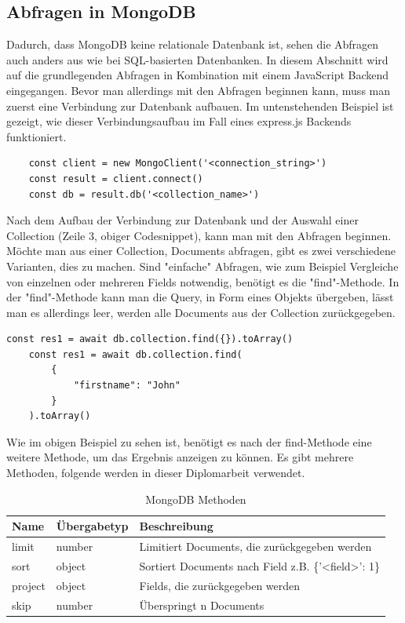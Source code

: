 \subsection{Abfragen in MongoDB}
Dadurch, dass MongoDB keine relationale Datenbank ist, sehen die Abfragen auch anders aus wie bei SQL-basierten Datenbanken. In diesem Abschnitt wird auf die grundlegenden Abfragen in Kombination mit einem JavaScript Backend eingegangen. Bevor man allerdings mit den Abfragen beginnen kann, muss man zuerst eine Verbindung zur Datenbank aufbauen. Im untenstehenden Beispiel ist gezeigt, wie dieser Verbindungsaufbau im Fall eines express.js Backends funktioniert.
\begin{lstlisting}
    const client = new MongoClient('<connection_string>')
    const result = client.connect()
    const db = result.db('<collection_name>')
\end{lstlisting}
Nach dem Aufbau der Verbindung zur Datenbank und der Auswahl einer Collection (Zeile 3, obiger Codesnippet), kann man mit den Abfragen beginnen.
\newline
Möchte man aus einer Collection, Documents abfragen, gibt es zwei verschiedene Varianten, dies zu machen. Sind "einfache" Abfragen, wie zum Beispiel Vergleiche von einzelnen oder mehreren Fields notwendig, benötigt es die "find"-Methode. In der "find"-Methode kann man die Query, in Form eines Objekts übergeben, lässt man es allerdings leer, werden alle Documents aus der Collection zurückgegeben.
\begin{lstlisting}[caption=Simple Abfrage in MongoDB]
    const res1 = await db.collection.find({}).toArray()
    const res1 = await db.collection.find(
        {
            "firstname": "John"
        }
    ).toArray()
\end{lstlisting}
Wie im obigen Beispiel zu sehen ist, benötigt es nach der find-Methode eine weitere Methode, um das Ergebnis anzeigen zu können. Es gibt mehrere Methoden, folgende werden in dieser Diplomarbeit verwendet.
\begin{table}[h]
\caption{MongoDB Methoden}
\label{demo-table}
    \begin{tabular}{ | m{3cm} | m{2.3cm}| m{8cm} | } 
        \hline
        Name & Übergabetyp & Beschreibung \\ [0.5ex] 
        \hline\hline
        limit & number & Limitiert Documents, die zurückgegeben werden \\
        \hline
        sort & object & Sortiert Documents nach Field z.B. \{'<field>': 1\} \\
        \hline
        project & object & Fields, die zurückgegeben werden \\
        \hline
        skip & number & Überspringt n Documents \\
        \hline
    \end{tabular}
\end{table}
